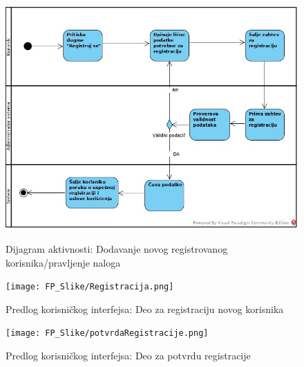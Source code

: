 \documentclass[20pt]{article}
\begin{document}
\begin{figure}[h]
        \centering
        \includegraphics[width=1.1\textwidth,height=0.74\textheight]{Pictures/DodavanjeNovogRegistrovanogKorisnika.jpg}\\
        \caption{Dijagram aktivnosti: Dodavanje novog registrovanog korisnika/pravljenje naloga}
        \label{fig:dijagramAktivnostiDodavanjeKorisnika}
    \end{figure}
\newpage

\begin{figure}[h]
        \centering
        \texttt{[image: FP\_Slike/Registracija.png]}\\
        \caption{Predlog korisni\v ckog interfejsa: Deo za registraciju novog korisnika}
   \end{figure}
\newpage
\begin{figure}[h]
        \centering
        \texttt{[image: FP\_Slike/potvrdaRegistracije.png]}\\
        \caption{Predlog korisni\v ckog interfejsa: Deo za potvrdu registracije}
    \end{figure}

\newpage
\end{document}
